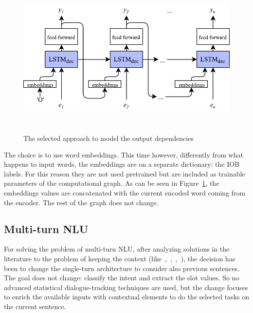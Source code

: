 
\begin{figure}[!htbp]
    \centering
    \includegraphics[max width=\linewidth,max height=8cm,keepaspectratio]{figures/outputDependencies}
    \caption{The selected approach to model the output dependencies}\label{fig:outputDependencies}
\end{figure}

The choice is to use word embeddings. This time however, differently from what happens to input words, the embeddings are on a separate dictionary: the IOB labels. For this reason they are not used pretrained but are included as trainable parameters of the computational graph. As can be seen in Figure~\ref{fig:outputDependencies}, the embeddings values are concatenated with the current encoded word coming from the encoder. The rest of the graph does not change.

\subsection{Multi-turn NLU}
\label{approachMultiTurn}

For solving the problem of multi-turn NLU, after analyzing solutions in the literature to the problem of keeping the context (like~\cite{xu2014contextual},~\cite{bhargava2013easy},~\cite{shi2015contextual},~\cite{serban2016building}), the decision has been to change the single-turn architecture to consider also previous sentences. The goal does not change: classify the intent and extract the slot values. So no advanced statistical dialogue-tracking techniques are used, but the change focuses to enrich the available inputs with contextual elements to do the selected tasks on the current sentence.

